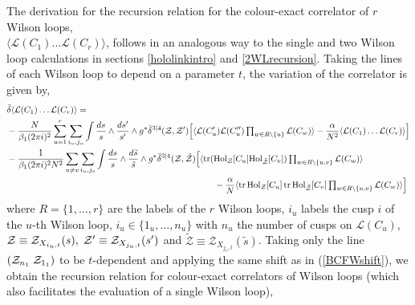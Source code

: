 \documentclass[12pt]{article}
\def \tr {\mathop{\rm tr}\nolimits}
\numberwithin{equation}{section}
\begin{document}
The derivation for the recursion relation for the colour-exact correlator of $r$ Wilson loops,\\
$\langle \mathcal{L}(C_1) \hdots \mathcal{L}(C_r)\rangle$, follows in an analogous way to the single and two Wilson loop calculations in sections \ref{hololinkintro} and \ref{2WLrecursion}. Taking the lines of each Wilson loop to depend on a parameter $t$, the variation of the correlator is given by,
\begin{align}
&\bar{\delta} \langle \mathcal{L}(C_1)\hdots \mathcal{L}(C_r)\rangle = \notag \\
&-\frac{N}{\beta_1 (2 \pi i)^2} \sum_{u=1}^r \sum_{i_u,j_u}  \int  \frac{ds}{s} \wedge\frac{ds'}{s'} \wedge g^* \bar{\delta}^{3|4}(\mathcal{Z},\mathcal{Z'})
\Bigl[ \langle \mathcal{L}(C^\prime_u) \mathcal{L}(C^{\prime \prime}_u) \textstyle\prod_{w\in R\backslash\{ u\}}\displaystyle\mathcal{L}(C_w)\rangle - \frac{\alpha}{N^2} \langle \mathcal{L}(C_1)\hdots \mathcal{L}(C_r)\rangle\Bigr] \notag \\
&-\frac{1}{\beta_1 (2 \pi i)^2 N^2} \sum_{u\neq v}\sum_{i_u,j_v} \int  \frac{ds}{s} \wedge\frac{d\tilde{s}}{\tilde{s}} \wedge g^* \bar{\delta}^{3|4}(\mathcal{Z},\tilde{\mathcal{Z}})\Bigl[ \langle \tr ({\rm Hol}_{\mathcal{Z}}[C_u] {\rm Hol}_{\tilde{\mathcal{Z}}}[C_v])\textstyle\prod_{w\in R \backslash \{u,v\}}\displaystyle \mathcal{L}(C_w)\rangle\notag\\
&\hspace{83mm}- \frac{\alpha}{N} \langle \tr {\rm Hol}_{\mathcal{Z}}[C_u] \tr {\rm Hol}_{\tilde{\mathcal{Z}}}[C_v]\textstyle\prod_{w\in R \backslash \{u,v\}}\displaystyle \mathcal{L}(C_w)\rangle \Bigr] 
\end{align}
where $R=\{1,\hdots,r\}$ are the labels of the $r$ Wilson loops, $i_u$ labels the cusp $i$ of the $u$-th Wilson loop, $i_u\in\{1_u,\hdots,n_u\}$ with $n_u$ the number of cusps on $\mathcal{L}(C_u)$, $\mathcal{Z}\equiv \mathcal{Z}_{X_{i_u,t}}(s), \hspace{1mm}\mathcal{Z^\prime}\equiv \mathcal{Z}_{X_{j_u,t}}(s^\prime)$ and $\mathcal{\tilde{Z}}\equiv \mathcal{Z}_{X_{j_v,t}}(\tilde{s})$. Taking only the line $(\mathcal{Z}_{n_1}\hspace{1mm} \mathcal{Z}_{1_1})$ to be $t$-dependent and applying the same shift as in (\ref{BCFWshift}), we obtain the recursion relation for colour-exact correlators of Wilson loops (which also facilitates the evaluation of a single Wilson loop),
\end{document}
